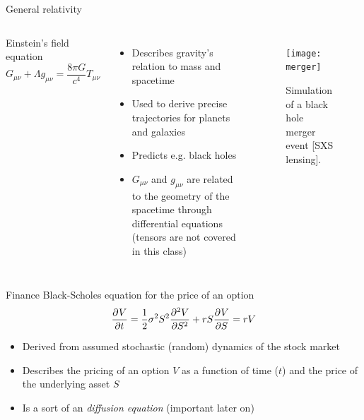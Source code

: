 
\begin{frame}{General relativity}
	\begin{columns}[T,onlytextwidth]
		Einstein's field equation
		$$
		G_{\mu \nu} + \Lambda g_{\mu \nu} = \frac{8 \pi G}{c^4} T_{\mu \nu}
		$$
		\begin{itemize}
			\item Describes gravity's relation to mass and spacetime 
			\item Used to derive precise trajectories for planets and galaxies
			\item Predicts e.g. black holes
			\item $ G_{\mu \nu} $ and $ g_{\mu \nu} $ are related to the geometry of the spacetime through differential equations (tensors are not covered in this class)
		\end{itemize}
		
		
		\vspace{2em}
		\begin{figure}
			\texttt{[image: merger]}
			\caption{Simulation of a black hole merger event [SXS lensing].}
		\end{figure}
	\end{columns}
\end{frame}


\begin{frame}{Finance}
		Black-Scholes equation for the price of an option
		$$
		\pfrac{V}{t} = \frac{1}{2}\sigma^2 S^2 \pfrac[2]{V}{S} + r S \pfrac{V}{S} = rV
		$$
		\begin{itemize}
			\item Derived from assumed stochastic (random) dynamics of the stock market
			\item Describes the pricing of an option $ V $ as a function of time ($ t $) and the price of the underlying asset $ S $
			\item Is a sort of an \emph{diffusion equation} (important later on)
		\end{itemize}
\end{frame}


